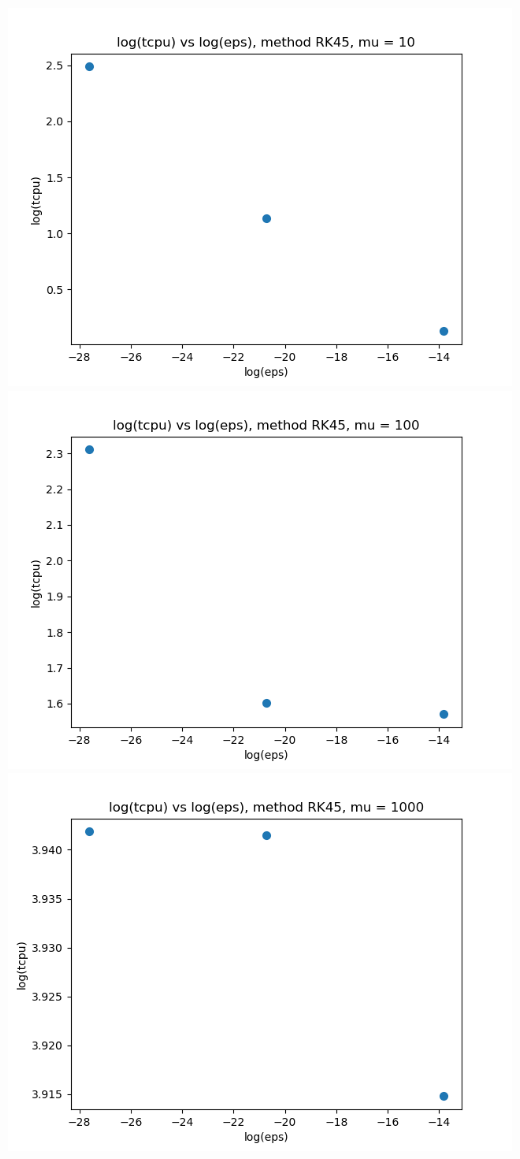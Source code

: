 \documentclass{article}
\begin{document}
\begin{enumerate}
\begin{enumerate}[label=(\alph*)]
\begin{center}
		\includegraphics[scale=.3]{hw2 p1b log(tcpu) vs log(eps), method RK45, mu = 10}
		\includegraphics[scale=.3]{hw2 p1b log(tcpu) vs log(eps), method RK45, mu = 100}
		\includegraphics[scale=.3]{hw2 p1b log(tcpu) vs log(eps), method RK45, mu = 1000}

\end{center}
\end{enumerate}
\end{enumerate}
\end{document}

